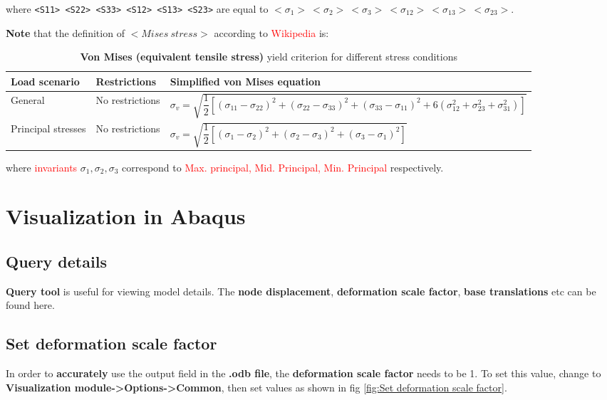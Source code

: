 \documentclass[10pt,a4paper]{article}
\begin{document}
where \lstinline|<S11> <S22> <S33> <S12> <S13> <S23>| are equal to $ <\sigma_1>~<\sigma_2>~<\sigma_3>~<\sigma_{12}>~<\sigma_{13}>~<\sigma_{23}> $. 

\textbf{Note} that the definition of $ <Mises~stress> $ according to \textcolor{red}{Wikipedia} is:
\begin{table}[h]
\caption{\textbf{Von Mises (equivalent tensile stress)} yield criterion for different stress conditions}
\begin{tabular}{|l|l|l|}
\hline
\textbf{Load scenario} & \textbf{Restrictions} & \textbf{Simplified von Mises equation} \\
\hline

General & No restrictions & $ \sigma_v = \sqrt{\dfrac{1}{2} \left[  (\sigma_{11}-\sigma_{22})^2 + (\sigma_{22}-\sigma_{33})^2 +(\sigma_{33}-\sigma_{11})^2 + 6(\sigma_{12}^2+\sigma_{23}^2+\sigma_{31}^2)  \right]   } $ \\
\hline
Principal stresses & No restrictions & $ \sigma_v = \sqrt{\dfrac{1}{2} \left[  (\sigma_{1}-\sigma_{2})^2 + (\sigma_{2}-\sigma_{3})^2 +(\sigma_{3}-\sigma_{1})^2 \right] } $ \\
\hline
\end{tabular}
\end{table}

where \textcolor{red}{invariants} $ \sigma_1, \sigma_2, \sigma_3 $ correspond to \textcolor{red}{Max. principal, Mid. Principal, Min. Principal} respectively.

\section{Visualization in Abaqus}

\subsection{Query details}
\textbf{Query tool} is useful for viewing model details. The \textbf{node displacement}, \textbf{deformation scale factor}, \textbf{base translations} etc can be found here.

\subsection{Set deformation scale factor}
In order to \textbf{accurately} use the output field in the \textbf{.odb file}, the \textbf{deformation scale factor} needs to be 1. To set this value, change to \textbf{Visualization module-\textgreater Options-\textgreater Common}, then set values as shown in fig \ref{fig:Set deformation scale factor}.
\end{document}

